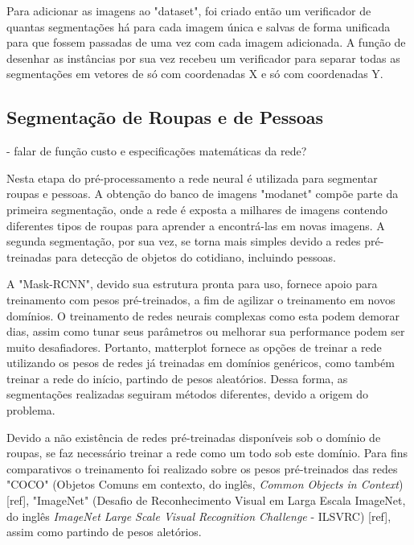 \documentclass[12pt]{report}
\begin{document}
Para adicionar as imagens ao "dataset", foi criado então um verificador de quantas segmentações há para cada imagem única e salvas de forma unificada para que fossem passadas de uma vez com cada imagem adicionada. A função de desenhar as instâncias por sua vez recebeu um verificador para separar todas as segmentações em vetores de só com coordenadas X e só com coordenadas Y. 


\subsection{Segmentação de Roupas e de Pessoas}

- falar de função custo e especificações matemáticas da rede?

Nesta etapa do pré-processamento a rede neural é utilizada para segmentar roupas e pessoas. A obtenção do banco de imagens "modanet" compõe parte da primeira segmentação, onde a rede é exposta a milhares de imagens contendo diferentes tipos de roupas para aprender a encontrá-las em novas imagens. A segunda segmentação, por sua vez, se torna mais simples devido a redes pré-treinadas para detecção de objetos do cotidiano, incluindo pessoas. 

A "Mask-RCNN", devido sua estrutura pronta para uso, fornece apoio para treinamento com pesos pré-treinados, a fim de agilizar o treinamento em novos domínios. O treinamento de redes neurais complexas como esta podem demorar dias, assim como tunar seus parâmetros ou melhorar sua performance podem ser muito desafiadores. Portanto, matterplot fornece as opções de treinar a rede utilizando os pesos de redes já treinadas em domínios genéricos, como também treinar a rede do início, partindo de pesos aleatórios. Dessa forma, as segmentações realizadas seguiram métodos diferentes, devido a origem do problema. 

Devido a não existência de redes pré-treinadas disponíveis sob o domínio de roupas, se faz necessário treinar a rede como um todo sob este domínio. Para fins comparativos o treinamento foi realizado sobre os pesos pré-treinados das redes "COCO" (Objetos Comuns em contexto, do inglês, \textit{Common Objects in Context}) [ref], "ImageNet" (Desafio de Reconhecimento Visual em Larga Escala ImageNet, do inglês \textit{ImageNet Large Scale Visual Recognition Challenge} - ILSVRC) [ref], assim como partindo de pesos aletórios. 
\end{document}
